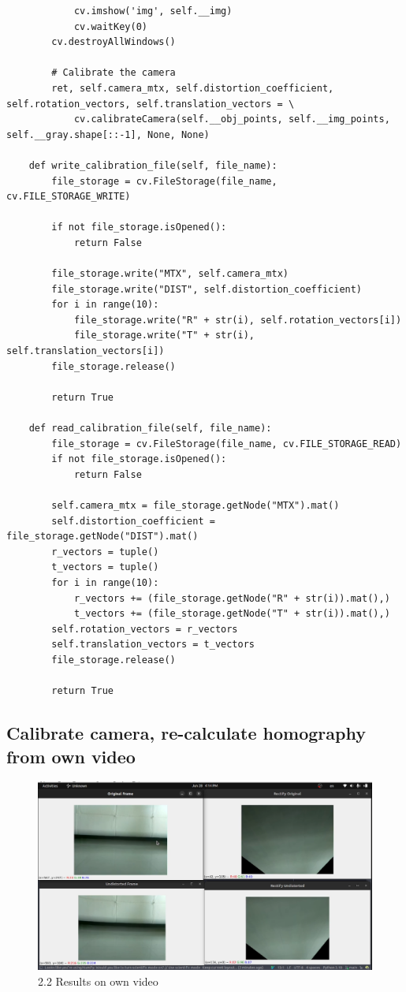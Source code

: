 \documentclass[a4paper, 12pt]{article}
\begin{document}
\begin{lstlisting}
            cv.imshow('img', self.__img)
            cv.waitKey(0)
        cv.destroyAllWindows()

        # Calibrate the camera
        ret, self.camera_mtx, self.distortion_coefficient, self.rotation_vectors, self.translation_vectors = \
            cv.calibrateCamera(self.__obj_points, self.__img_points, self.__gray.shape[::-1], None, None)

    def write_calibration_file(self, file_name):
        file_storage = cv.FileStorage(file_name, cv.FILE_STORAGE_WRITE)

        if not file_storage.isOpened():
            return False

        file_storage.write("MTX", self.camera_mtx)
        file_storage.write("DIST", self.distortion_coefficient)
        for i in range(10):
            file_storage.write("R" + str(i), self.rotation_vectors[i])
            file_storage.write("T" + str(i), self.translation_vectors[i])
        file_storage.release()

        return True

    def read_calibration_file(self, file_name):
        file_storage = cv.FileStorage(file_name, cv.FILE_STORAGE_READ)
        if not file_storage.isOpened():
            return False

        self.camera_mtx = file_storage.getNode("MTX").mat()
        self.distortion_coefficient = file_storage.getNode("DIST").mat()
        r_vectors = tuple()
        t_vectors = tuple()
        for i in range(10):
            r_vectors += (file_storage.getNode("R" + str(i)).mat(),)
            t_vectors += (file_storage.getNode("T" + str(i)).mat(),)
        self.rotation_vectors = r_vectors
        self.translation_vectors = t_vectors
        file_storage.release()

        return True
	\end{lstlisting}

	\subsection{Calibrate camera, re-calculate homography from own video}
	
	\begin{figure}
		\caption{2.2 Results on own video}
		\includegraphics[scale=0.3]{images/own_video_result.png}
	\end{figure}
\end{document}
